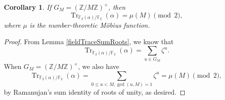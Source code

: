 \documentclass[a4paper]{article}
\newtheorem{corollary}[theorem]{Corollary}
\newcommand{\F}{\mathbb{F}}
\newcommand{\Z}{\mathbb{Z}}
\newcommand{\Tr}[2][]{\operatorname{Tr}_{#1}\!\left( #2 \right)}
\begin{document}
	\begin{corollary}\label{traceMobius}
		If $G_M = (\Z / M\Z)^{\times}$, then
		\begin{equation*}
			\Tr[\F_2(\alpha) / \F_2]{\alpha} = \mu(M) \pmod 2,
		\end{equation*}
		where $\mu$ is the number-theoretic Möbius function.
	\end{corollary}
	\begin{proof}
		From Lemma \ref{fieldTraceSumRoots}, we know that
		\begin{equation*}
			\Tr[\F_2(\alpha) / \F_2]{\alpha} = \sum_{u \in G_M}{\zeta^{u}}.
		\end{equation*}
		When $G_M = (\Z / M\Z)^{\times}$, we also have
		\begin{equation*}
			\Tr[\F_2(\alpha) / \F_2]{\alpha} = \sum_{0 \leq u < M, \gcd{(u,M)} = 1}{\zeta^{u}} = \mu(M) \pmod 2,
		\end{equation*}
		by Ramanujan's sum identity of roots of unity, as desired.
	\end{proof}
	
\end{document}
